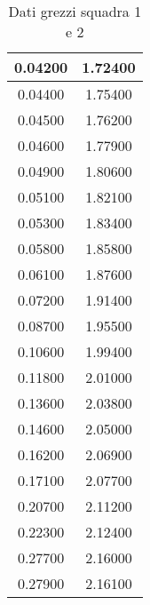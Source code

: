 \begin{table}[H]
\begin{tabular}{|c|c|}
    0.04200         & 1.72400      \\ \hline
    0.04400         & 1.75400      \\ \hline
    0.04500         & 1.76200      \\ \hline
    0.04600         & 1.77900      \\ \hline
    0.04900         & 1.80600      \\ \hline
    0.05100         & 1.82100      \\ \hline
    0.05300         & 1.83400      \\ \hline
    0.05800         & 1.85800      \\ \hline
    0.06100         & 1.87600      \\ \hline
    0.07200         & 1.91400      \\ \hline
    0.08700         & 1.95500      \\ \hline
    0.10600         & 1.99400      \\ \hline
    0.11800         & 2.01000      \\ \hline
    0.13600         & 2.03800      \\ \hline
    0.14600         & 2.05000      \\ \hline
    0.16200         & 2.06900      \\ \hline
    0.17100         & 2.07700      \\ \hline
    0.20700         & 2.11200      \\ \hline
    0.22300         & 2.12400      \\ \hline
    0.27700         & 2.16000      \\ \hline
    0.27900         & 2.16100      \\ \hline
    \end{tabular}
    \caption{Dati grezzi squadra 1 e 2}
\end{table}

